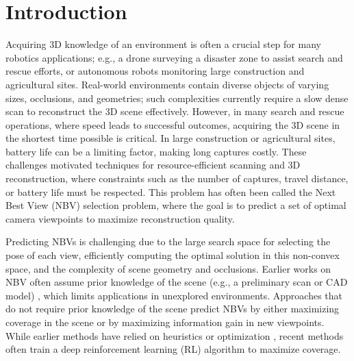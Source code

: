 \vspace{-1.25em}
\section{Introduction}
\label{sec:intro}
\vspace{-0.25em}

Acquiring 3D knowledge of an environment is often a crucial step for many robotics applications; e.g., a drone surveying a disaster zone to assist search and rescue efforts, or autonomous robots monitoring large construction and agricultural sites. 
Real-world environments contain diverse objects of varying sizes, occlusions, and geometries; such complexities currently require a slow dense scan \cite{furukawa2010towards, schonberger2016pixelwise, frahm2010building, agarwal2011building, bleyer2011patchmatch, furukawa2009accurate, goesele2007multi, strecha2004wide} to reconstruct the 3D scene effectively. However, in many search and rescue operations, where speed leads to successful outcomes, acquiring the 3D scene in the shortest time possible is critical. In large construction or agricultural sites, battery life can be a limiting factor, making long captures costly. These challenges motivated techniques for resource-efficient scanning and 3D reconstruction, where constraints such as the number of captures, travel distance, or battery life must be respected. This problem has often been called the Next Best View (NBV) selection problem, where the goal is to predict a set of optimal camera viewpoints to maximize reconstruction quality.

Predicting NBVs is challenging due to the large search space for selecting the pose of each view, efficiently computing the optimal solution in this non-convex space, and the complexity of scene geometry and occlusions. Earlier works on NBV often assume prior knowledge of the scene (e.g., a preliminary scan or CAD model) \cite{devrim2017reinforcement,sun2021learning,zhang2021continuous,yan2021sampling, jing2016view, zhou2020offsite}, which limits applications in unexplored environments. Approaches that do not require prior knowledge of the scene predict NBVs by either maximizing coverage in the scene \cite{maver1993occlusions,roberts2017submodular,hepp2018learn,peralta2020next,guedon2022scone,guedon2023macarons} or by maximizing information gain \cite{hepp2018plan3d,zhang2021continuous,jiang2023fisherrf} in new viewpoints. While earlier methods have relied on heuristics or optimization \cite{maver1993occlusions,roberts2017submodular}, recent methods often train a deep reinforcement learning (RL) algorithm \cite{hepp2018learn,peralta2020next,hepp2018plan3d,zhang2021continuous,ran2023neurar,jiang2023fisherrf,9340916,chen2024gennbv} to maximize coverage. 

